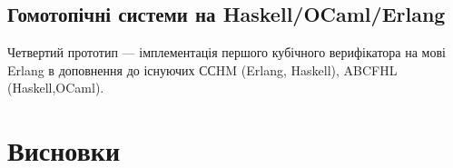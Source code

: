 \subsection{Гомотопічні системи на Haskell/OCaml/Erlang}
Четвертий прототип --- імплементація першого кубічного верифікатора на
мові Erlang в доповнення до існуючих ССHM (Erlang, Haskell),
ABCFHL (Haskell,OCaml).

\newpage
\section{Висновки}

